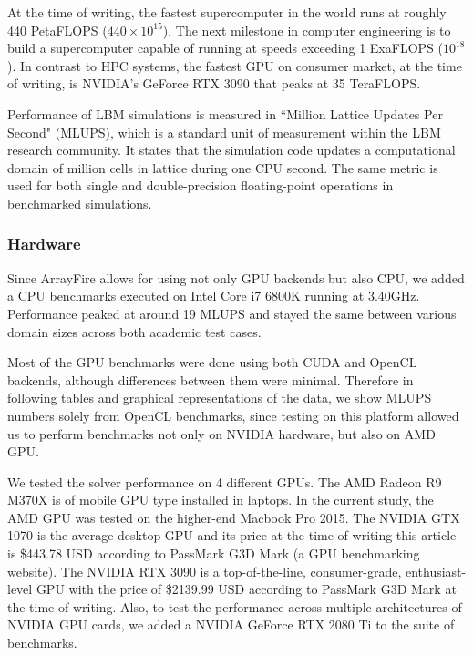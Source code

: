 At the time of writing, the fastest supercomputer in the world runs at roughly 440 PetaFLOPS ($440\times10^{15}$). The next milestone in computer engineering is to build a supercomputer capable of running at speeds exceeding 1 ExaFLOPS ($10^{18}$). In contrast to HPC systems, the fastest GPU on consumer market, at the time of writing, is NVIDIA's GeForce RTX 3090 that peaks at 35 TeraFLOPS.

Performance of LBM simulations is measured in ``Million Lattice Updates Per Second" (MLUPS), which is a standard unit of measurement within the LBM research community. It states that the simulation code updates a computational domain of million cells in lattice during one CPU second. The same metric is used for both single and double-precision floating-point operations in benchmarked simulations. 

\subsubsection{Hardware}
Since ArrayFire allows for using not only GPU backends but also CPU, we added a CPU benchmarks executed on Intel Core i7 6800K running at 3.40GHz. Performance peaked at around 19 MLUPS and stayed the same between various domain sizes across both academic test cases.

Most of the GPU benchmarks were done using both CUDA and OpenCL backends, although differences between them were minimal. Therefore in following tables and graphical representations of the data, we show MLUPS numbers solely from OpenCL benchmarks, since testing on this platform allowed us to perform benchmarks not only on NVIDIA hardware, but also on AMD GPU.

We tested the solver performance on 4 different GPUs. The AMD Radeon R9 M370X is of mobile GPU type installed in laptops. In the current study, the AMD GPU was tested on the higher-end Macbook Pro 2015. The NVIDIA GTX 1070 is the average desktop GPU and its price at the time of writing this article is \$443.78 USD according to PassMark G3D Mark (a GPU benchmarking website). The NVIDIA RTX 3090 is a top-of-the-line, consumer-grade, enthusiast-level GPU with the price of \$2139.99 USD according to PassMark G3D Mark at the time of writing. Also, to test the performance across multiple architectures of NVIDIA GPU cards, we added a NVIDIA GeForce RTX 2080 Ti to the suite of benchmarks.

